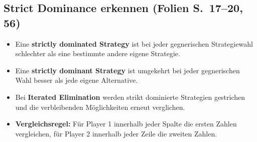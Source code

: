 \documentclass[11pt,a4paper]{article}
\newcommand{\block}[2]{\subsection*{#1 {\normalfont\small (Folien S.~#2)}}}
\begin{document}
\block{Strict Dominance erkennen}{17--20, 56}
\begin{itemize}
\item Eine \textbf{strictly dominated Strategy} ist bei jeder gegnerischen Strategiewahl schlechter als eine bestimmte andere eigene Strategie.
\item Eine \textbf{strictly dominant Strategy} ist umgekehrt bei jeder gegnerischen Wahl besser als jede eigene Alternative.
\item Bei \textbf{Iterated Elimination} werden strikt dominierte Strategien gestrichen und die verbleibenden Möglichkeiten erneut verglichen.
\item \textbf{Vergleichsregel:} Für Player 1 innerhalb jeder Spalte die ersten Zahlen vergleichen, für Player 2 innerhalb jeder Zeile die zweiten Zahlen.
\end{itemize}

\newpage
\end{document}
